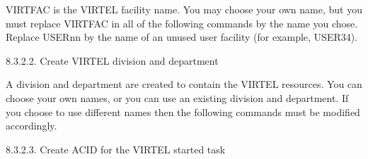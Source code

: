 \documentclass[letterpaper,10pt,english]{sphinxmanual}
\begin{document}

VIRTFAC is the VIRTEL facility name. You may choose your own name, but you must replace VIRTFAC in all of the following commands by the name you chose. Replace USERnn by the name of an unused user facility (for example, USER34).

8.3.2.2. Create VIRTEL division and department

\begin{sphinxVerbatim}[commandchars=\\\{\}]
   
    
\end{sphinxVerbatim}


A division and department are created to contain the VIRTEL resources. You can choose your own names, or you can use an existing division and department. If you choose to use different names then the following commands must be modified accordingly.

8.3.2.3. Create ACID for the VIRTEL started task

\begin{sphinxVerbatim}[commandchars=\\\{\}]
    
           
          
\end{sphinxVerbatim}

\end{document}
